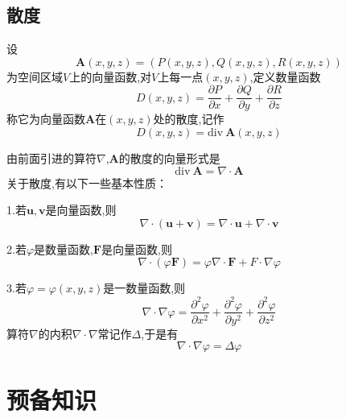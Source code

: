 \documentclass{article}
\begin{document}
\subsection{散度}
设
\begin{equation*}
\boldsymbol{A}(x,y,z)=(P(x,y,z),Q(x,y,z),R(x,y,z))
\end{equation*}
为空间区域$V$上的向量函数,对$V$上每一点$(x,y,z)$,定义数量函数
\begin{equation*}
D(x,y,z)=\frac{\partial P}{\partial x}+\frac{\partial Q}{\partial y}+\frac{\partial R}{\partial z}
\end{equation*}
称它为向量函数$\boldsymbol{A}$在$(x,y,z)$处的散度,记作
\begin{equation*}
D(x,y,z)=\text{div}~\boldsymbol{A}(x,y,z)
\end{equation*}

由前面引进的算符$\nabla$,$\boldsymbol{A}$的散度的向量形式是
\begin{equation*}
\text{div}~\boldsymbol{A}=\nabla\cdot\boldsymbol{A}
\end{equation*}
关于散度,有以下一些基本性质：

1.若$\boldsymbol{u},\boldsymbol{v}$是向量函数,则
\begin{equation*}
\nabla\cdot(\boldsymbol{u}+\boldsymbol{v})=\nabla\cdot\boldsymbol{u}+\nabla\cdot\boldsymbol{v}
\end{equation*}

2.若$\varphi$是数量函数,$\boldsymbol{F}$是向量函数,则
\begin{equation*}
\nabla\cdot(\varphi\boldsymbol{F})=\varphi\nabla\cdot\boldsymbol{F}+F\cdot\nabla\varphi
\end{equation*}

3.若$\varphi=\varphi(x,y,z)$是一数量函数,则
\begin{equation*}
\nabla\cdot\nabla\varphi=\frac{\partial^2\varphi}{\partial x^2}+\frac{\partial^2\varphi}{\partial y^2}+\frac{\partial^2\varphi}{\partial z^2}
\end{equation*}
算符$\nabla$的内积$\nabla\cdot\nabla$常记作$\Delta$,于是有
\begin{equation*}
\nabla\cdot\nabla\varphi=\Delta\varphi
\end{equation*}
\section{预备知识}
\end{document}
